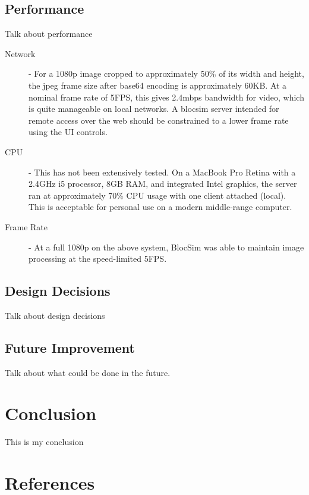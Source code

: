 \documentclass[titlesmallcaps, examinerscopy, copyrightpage]{uqthesis}
\begin{document}
\newpage

\section{Performance}

Talk about performance

\begin{description}
	\item[Network] - For a 1080p image cropped to approximately 50\% of its width and height, the jpeg frame size after base64 encoding is approximately 60KB. At a nominal frame rate of 5FPS, this gives 2.4mbps bandwidth for video, which is quite manageable on local networks. A blocsim server intended for remote access over the web should be constrained to a lower frame rate using the UI controls.
	\item[CPU] - This has not been extensively tested. On a MacBook Pro Retina with a 2.4GHz i5 processor, 8GB RAM, and integrated Intel graphics, the server ran at approximately 70\% CPU usage with one client attached (local). This is acceptable for personal use on a modern middle-range computer. 
	\item[Frame Rate] - At a full 1080p on the above system, BlocSim was able to maintain image processing at the speed-limited 5FPS.
\end{description}


\section{Design Decisions}
\label{ch:review:design}

Talk about design decisions

\section{Future Improvement}

Talk about what could be done in the future.

\chapter{Conclusion}

 This is my conclusion




























\chapter*{References}
\begingroup
{}
\renewcommand{\addcontentsline}[3]{}
\renewcommand{\chapter}[2]{}

\endgroup


\end{document}
